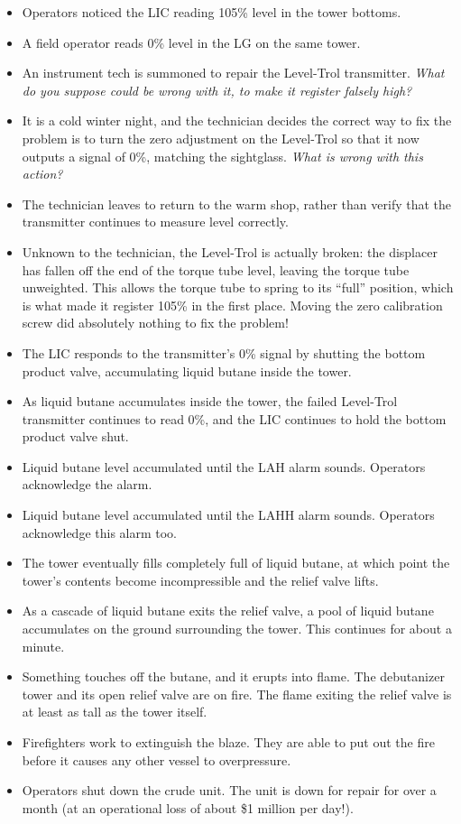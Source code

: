 \begin{itemize}
\item{} Operators noticed the LIC reading 105\% level in the tower bottoms.
\item{} A field operator reads 0\% level in the LG on the same tower.
\item{} An instrument tech is summoned to repair the Level-Trol transmitter.  {\it What do you suppose could be wrong with it, to make it register falsely high?}
\item{} It is a cold winter night, and the technician decides the correct way to fix the problem is to turn the zero adjustment on the Level-Trol so that it now outputs a signal of 0\%, matching the sightglass.  {\it What is wrong with this action?}
\item{} The technician leaves to return to the warm shop, rather than verify that the transmitter continues to measure level correctly.
\item{} Unknown to the technician, the Level-Trol is actually broken: the displacer has fallen off the end of the torque tube level, leaving the torque tube unweighted.  This allows the torque tube to spring to its ``full'' position, which is what made it register 105\% in the first place.  Moving the zero calibration screw did absolutely nothing to fix the problem!
\item{} The LIC responds to the transmitter's 0\% signal by shutting the bottom product valve, accumulating liquid butane inside the tower.
\item{} As liquid butane accumulates inside the tower, the failed Level-Trol transmitter continues to read 0\%, and the LIC continues to hold the bottom product valve shut.
\item{} Liquid butane level accumulated until the LAH alarm sounds.  Operators acknowledge the alarm.
\item{} Liquid butane level accumulated until the LAHH alarm sounds.  Operators acknowledge this alarm too.
\item{} The tower eventually fills completely full of liquid butane, at which point the tower's contents become incompressible and the relief valve lifts.
\item{} As a cascade of liquid butane exits the relief valve, a pool of liquid butane accumulates on the ground surrounding the tower.  This continues for about a minute.
\item{} Something touches off the butane, and it erupts into flame.  The debutanizer tower and its open relief valve are on fire.  The flame exiting the relief valve is at least as tall as the tower itself.
\item{} Firefighters work to extinguish the blaze.  They are able to put out the fire before it causes any other vessel to overpressure.
\item{} Operators shut down the crude unit.  The unit is down for repair for over a month (at an operational loss of about \$1 million per day!).
\end{itemize}


